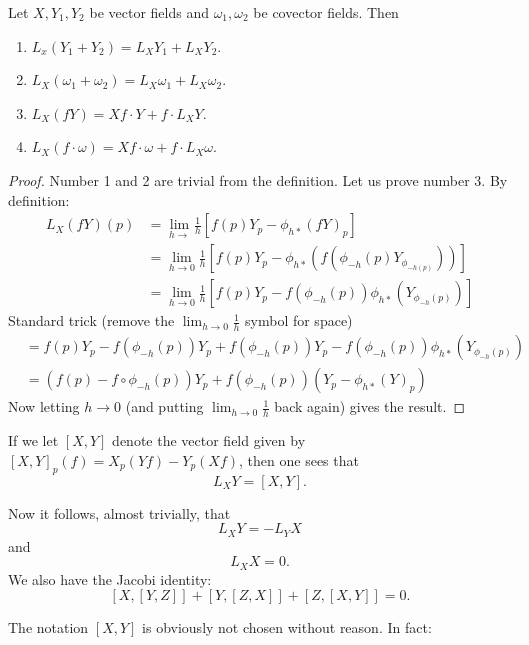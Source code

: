 \documentclass[11pt, english]{article}
\begin{document}
\begin{prop}
Let $X,Y_1,Y_2$ be vector fields and $\omega_1,\omega_2$ be covector fields. Then
\begin{enumerate}
\item $L_x(Y_1 +Y_2) = L_XY_1+L_XY_2$.
\item $L_X(\omega_1+\omega_2)=L_X\omega_1+L_X\omega_2$.
\item $L_X(fY) = Xf \cdot Y + f \cdot L_XY$.
\item $L_X(f \cdot \omega) = Xf \cdot \omega + f \cdot L_X \omega$.
\end{enumerate}
\end{prop}
\begin{proof}
Number 1 and 2 are trivial from the definition. Let us prove number 3. By definition:
\begin{align}
L_X(fY)(p) &= \lim_{h \to} \frac 1h \left[ f(p)Y_p - \phi_{h \ast} (fY)_p \right] \\
&= \lim_{h \to 0} \frac 1h \left[ f(p)Y_p - \phi_{h \ast}(f(\phi_{-h}(p)Y_{\phi_{-h(p)}})) \right] \\
&= \lim_{h \to 0} \frac 1h \left[ f(p)Y_p - f(\phi_{-h}(p)) \phi_{h \ast}(Y_{\phi_{-h}(p)})\right]
\end{align}
Standard trick (remove the $\lim_{h \to 0} \frac 1h$ symbol for space)
\begin{align}
&= f(p)Y_p-f(\phi_{-h}(p))Y_p + f(\phi_{-h}(p))Y_p - f(\phi_{-h}(p))\phi_{h \ast}(Y_{\phi_{-h}(p)}) \\
&= \left( f(p)-f \circ \phi_{-h}(p) \right) Y_p + f(\phi_{-h}(p))\left( Y_p - \phi_{h\ast}(Y)_p\right)
\end{align}
Now letting $h \to 0$ (and putting $\lim_{h \to 0} \frac 1h$ back again) gives the result.
\end{proof}

If we let $[X,Y]$ denote the vector field given by $[X,Y]_p(f)=X_p(Yf)-Y_p(Xf)$, then one sees that
\[
L_XY = [X,Y].
\]

Now it follows, almost trivially, that
\[
L_XY = -L_YX
\]
and
\[
L_XX=0.
\]
We also have the Jacobi identity:
\[
[X,[Y,Z]] + [Y,[Z,X]]+[Z,[X,Y]] = 0.
\]

The notation $[X,Y]$ is obviously not chosen without reason. In fact:
\end{document}
